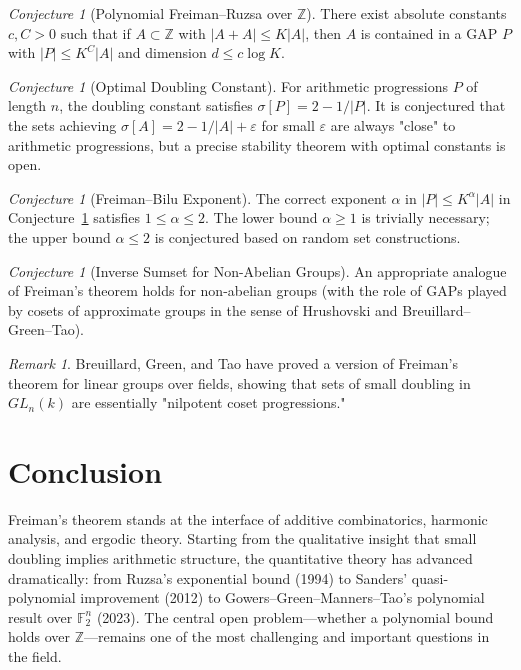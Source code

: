\documentclass[12pt,a4paper]{amsart}
\theoremstyle{definition}
\theoremstyle{remark}
\newtheorem{remark}[theorem]{Remark}
\newtheorem{conjecture}[theorem]{Conjecture}
\newcommand{\F}{\mathbb{F}}
\newcommand{\Z}{\mathbb{Z}}
\begin{document}
\begin{conjecture}[Polynomial Freiman--Ruzsa over $\Z$]\label{conj:pfr_z}
There exist absolute constants $c, C > 0$ such that if $A \subset \Z$ with
$|A+A| \leq K|A|$, then $A$ is contained in a GAP $P$ with $|P| \leq K^C |A|$
and dimension $d \leq c \log K$.
\end{conjecture}

\begin{conjecture}[Optimal Doubling Constant]\label{conj:optimal_doubling}
For arithmetic progressions $P$ of length $n$, the doubling constant satisfies
$\sigma[P] = 2 - 1/|P|$. It is conjectured that the sets achieving $\sigma[A]
= 2 - 1/|A| + \varepsilon$ for small $\varepsilon$ are always "close" to arithmetic
progressions, but a precise stability theorem with optimal constants is open.
\end{conjecture}

\begin{conjecture}[Freiman--Bilu Exponent]\label{conj:freiman_bilu}
The correct exponent $\alpha$ in $|P| \leq K^\alpha |A|$ in
Conjecture~\ref{conj:pfr_z} satisfies $1 \leq \alpha \leq 2$. The lower bound
$\alpha \geq 1$ is trivially necessary; the upper bound $\alpha \leq 2$ is
conjectured based on random set constructions.
\end{conjecture}

\begin{conjecture}[Inverse Sumset for Non-Abelian Groups]\label{conj:nonabelian}
An appropriate analogue of Freiman's theorem holds for non-abelian groups
(with the role of GAPs played by cosets of approximate groups in the sense
of Hrushovski and Breuillard--Green--Tao).
\end{conjecture}

\begin{remark}
Breuillard, Green, and Tao \cite{BreuillardGreenTao2012} have proved a version of
Freiman's theorem for linear groups over fields, showing that sets of small doubling
in $GL_n(k)$ are essentially "nilpotent coset progressions."
\end{remark}

\section{Conclusion}

Freiman's theorem stands at the interface of additive combinatorics, harmonic
analysis, and ergodic theory. Starting from the qualitative insight that small
doubling implies arithmetic structure, the quantitative theory has advanced
dramatically: from Ruzsa's exponential bound (1994) to Sanders' quasi-polynomial
improvement (2012) to Gowers--Green--Manners--Tao's polynomial result over $\F_2^n$
(2023). The central open problem---whether a polynomial bound holds over $\Z$---remains
one of the most challenging and important questions in the field.
\end{document}
